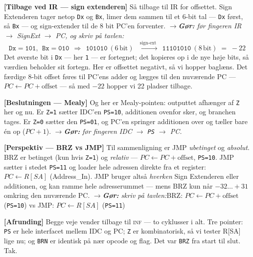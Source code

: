 \documentclass[11pt,a4paper]{article}
\newcommand{\gor}[1]{{\color{accent!90}\itshape$\rightarrow$\;\textbf{Gør:} #1}}
\begin{document}
\textbf{[Tilbage ved IR --- sign extenderen]} Så tilbage til IR for offsettet. Sign Extenderen
tager netop \texttt{Dx} og \texttt{Bx}, limer dem sammen til et 6-bit tal --- \texttt{Dx} først,
så \texttt{Bx} --- og sign-extender til de 8 bit PC'en forventer.
\gor{før fingeren IR $\to$ SignExt $\to$ PC, og skriv på tavlen:}
\[
  \texttt{Dx}=\texttt{101},\ \ \texttt{Bx}=\texttt{010}
  \ \ \Rightarrow\ \ \texttt{101010}\ (6\,\text{bit})
  \ \ \xrightarrow{\ \text{sign-ext}\ }\ \ \texttt{11101010}\ (8\,\text{bit}) \;=\; -22
\]
Det øverste bit i \texttt{Dx} --- her \texttt{1} --- er fortegnet; det kopieres op i de nye høje
bits, så værdien beholder sit fortegn. Her er offsettet negativt, så vi hopper baglæns.
Det færdige 8-bit offset føres til PC'ens adder og lægges til den nuværende PC ---
\(PC \leftarrow PC + \text{offset}\) --- så med $-22$ hopper vi 22 pladser tilbage.

\textbf{[Beslutningen --- Mealy]} Og her er Mealy-pointen: outputtet afhænger af \texttt{Z} her og
nu. Er \texttt{Z=1} sætter IDC'en \texttt{PS=10}, additionen ovenfor sker, og branchen tages. Er
\texttt{Z=0} sætter den \texttt{PS=01}, og PC'en springer additionen over og tæller bare én op
($PC+1$).
\gor{før fingeren IDC $\to$ \texttt{PS} $\to$ PC.}

\textbf{[Perspektiv --- BRZ vs JMP]} Til sammenligning er JMP \emph{ubetinget} og \emph{absolut}.
BRZ er betinget (kun hvis \texttt{Z=1}) og \emph{relativ} --- $PC \leftarrow PC + \text{offset}$,
\texttt{PS=10}. JMP sætter i stedet \texttt{PS=11} og loader hele adressen direkte fra et
register: $PC \leftarrow R[SA]$ (Address\_In). JMP bruger altså \emph{hverken} Sign Extenderen
eller additionen, og kan ramme hele adresserummet --- mens BRZ kun når $-32\ldots+31$ omkring
den nuværende PC.
\gor{skriv på tavlen:}\quad BRZ: $PC\!\leftarrow\!PC+\text{offset}$ (\texttt{PS=10}) \quad vs \quad JMP: $PC\!\leftarrow\!R[SA]$ (\texttt{PS=11})

\textbf{[Afrunding]} Begge veje vender tilbage til \textsc{inf} --- to cyklusser i alt. Tre
pointer: \texttt{PS} er hele interfacet mellem IDC og PC; \texttt{Z} er kombinatorisk, så vi
tester R[SA] lige nu; og \texttt{BRN} er identisk på nær opcode og flag. Det var \texttt{BRZ} fra
start til slut. Tak.
\end{document}
